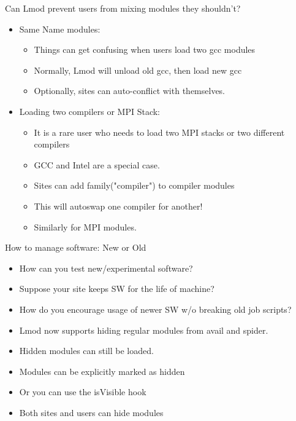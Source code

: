 \documentclass{beamer}
\begin{document}
\begin{frame}{Can Lmod prevent users from mixing modules they shouldn't?}
  \begin{itemize}
      \item Same Name modules:
      \begin{itemize}
        \item Things can get confusing when users load two gcc modules
        \item Normally, Lmod will unload old gcc, then load new gcc
        \item Optionally, sites can auto-conflict with themselves.
      \end{itemize}
    \item Loading two compilers or MPI Stack:
      \begin{itemize}
        \item It is a rare user who needs to load two MPI stacks or
          two different compilers
        \item GCC and Intel are a special case.
        \item Sites can add family("compiler") to compiler modules
        \item This will autoswap one compiler for another!
        \item Similarly for MPI modules.
      \end{itemize}
  \end{itemize}
\end{frame}

\begin{frame}{How to manage software: New or Old}
  \begin{itemize}
    \item How can you test new/experimental software?
    \item Suppose your site keeps SW for the life of machine?
    \item How do you encourage usage of newer SW w/o breaking old job
      scripts?
    \item Lmod now supports hiding regular modules from avail and
      spider.
    \item Hidden modules can still be loaded.
    \item Modules can be explicitly marked as hidden
    \item Or you can use the isVisible hook
    \item Both sites and users can hide modules
  \end{itemize}
\end{frame}
\end{document}
